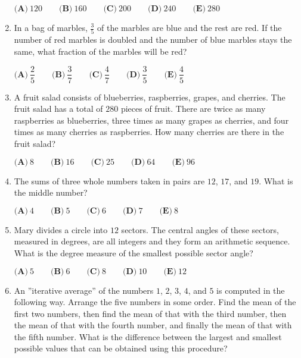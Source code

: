 \documentclass{article}
\begin{document}
\begin{enumerate}[label=\arabic*., itemsep=0.5em]
$\textbf{(A)}\ 120\qquad\textbf{(B)}\ 160\qquad\textbf{(C)}\ 200\qquad\textbf{(D)}\ 240\qquad\textbf{(E)}\ 280$\par \vspace{0.5em}\item In a bag of marbles, $\tfrac{3}{5}$ of the marbles are blue and the rest are red.  If the number of red marbles is doubled and the number of blue marbles stays the same, what fraction of the marbles will be red?

$ \textbf{(A)}\ \dfrac{2}{5}
\qquad\textbf{(B)}\ \dfrac{3}{7}
\qquad\textbf{(C)}\ \dfrac{4}{7}
\qquad\textbf{(D)}\ \dfrac{3}{5}
\qquad\textbf{(E)}\ \dfrac{4}{5}
 $\par \vspace{0.5em}\item A fruit salad consists of blueberries, raspberries, grapes, and cherries.  The fruit salad has a total of $280$ pieces of fruit.  There are twice as many raspberries as blueberries, three times as many grapes as cherries, and four times as many cherries as raspberries.  How many cherries are there in the fruit salad?

$ \textbf{(A)}\ 8\qquad\textbf{(B)}\ 16\qquad\textbf{(C)}\ 25\qquad\textbf{(D)}\ 64\qquad\textbf{(E)}\ 96 $\par \vspace{0.5em}\item The sums of three whole numbers taken in pairs are $12$, $17$, and $19$.  What is the middle number?

$ \textbf{(A)}\ 4\qquad\textbf{(B)}\ 5\qquad\textbf{(C)}\ 6\qquad\textbf{(D)}\ 7\qquad\textbf{(E)}\ 8 $\par \vspace{0.5em}\item Mary divides a circle into $12$ sectors.  The central angles of these sectors, measured in degrees, are all integers and they form an arithmetic sequence.  What is the degree measure of the smallest possible sector angle?

$ \textbf{(A)}\ 5\qquad\textbf{(B)}\ 6\qquad\textbf{(C)}\ 8\qquad\textbf{(D)}\ 10\qquad\textbf{(E)}\ 12 $\par \vspace{0.5em}\item An ''iterative average'' of the numbers $1$, $2$, $3$, $4$, and $5$ is computed in the following way.  Arrange the five numbers in some order.  Find the mean of the first two numbers, then find the mean of that with the third number, then the mean of that with the fourth number, and finally the mean of that with the fifth number.  What is the difference between the largest and smallest possible values that can be obtained using this procedure?


\end{enumerate}
\end{document}
